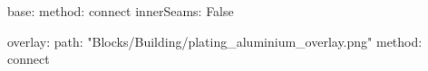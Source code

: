 base:
  method: connect
  innerSeams: False

overlay:
  path: "Blocks/Building/plating_aluminium_overlay.png"
  method: connect
